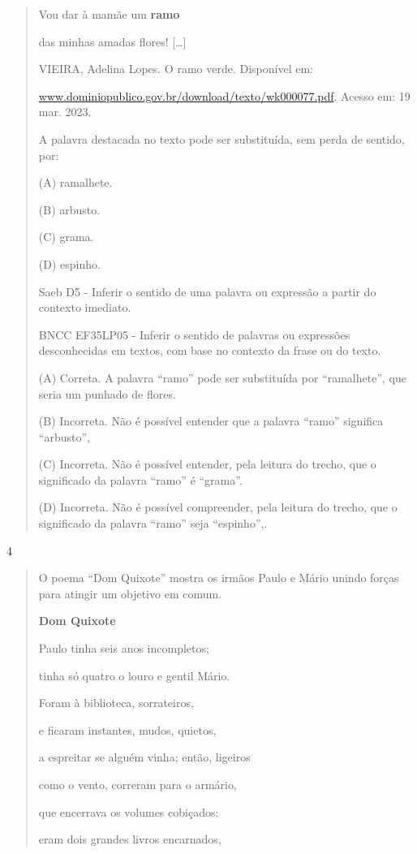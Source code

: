 \begin{escolha}
\begin{escolha}
{\begin{quote}
Vou dar à mamãe um \textbf{ramo}

das minhas amadas flores! {[}\ldots{}{]}

VIEIRA, Adelina Lopes. O ramo verde. Disponível em:

\href{http://www.dominiopublico.gov.br/download/texto/wk000077.pdf}{www.dominiopublico.gov.br/download/texto/wk000077.pdf}.
Acesso em: 19 mar. 2023.

A palavra destacada no texto pode ser substituída, sem perda de sentido,
por:

(A) ramalhete.

(B) arbusto.

(C) grama.

(D) espinho.

Saeb D5 - Inferir o sentido de uma palavra ou expressão a partir do
contexto imediato.

BNCC EF35LP05 - Inferir o sentido de palavras ou expressões
desconhecidas em textos, com base no contexto da frase ou do texto.

(A) Correta. A palavra ``ramo'' pode ser substituída por ``ramalhete'',
que seria um punhado de flores.

(B) Incorreta. Não é possível entender que a palavra ``ramo'' significa
``arbusto'',

(C) Incorreta. Não é possível entender, pela leitura do trecho, que o
significado da palavra ``ramo'' é ``grama''.

(D) Incorreta. Não é possível compreender, pela leitura do trecho, que o
significado da palavra ``ramo'' seja ``espinho'',.
\end{quote}

\num{4}

\begin{quote}
O poema ``Dom Quixote'' mostra os irmãos Paulo e Mário unindo forças
para atingir um objetivo em comum.

\textbf{Dom Quixote}

Paulo tinha seis anos incompletos;

tinha só quatro o louro e gentil Mário.

Foram à biblioteca, sorrateiros,

e ficaram instantes, mudos, quietos,

a espreitar se alguém vinha; então, ligeiros

como o vento, correram para o armário,

que encerrava os volumes cobiçados:

eram dois grandes livros encarnados,


\end{quote}}
\end{escolha}
\end{escolha}
